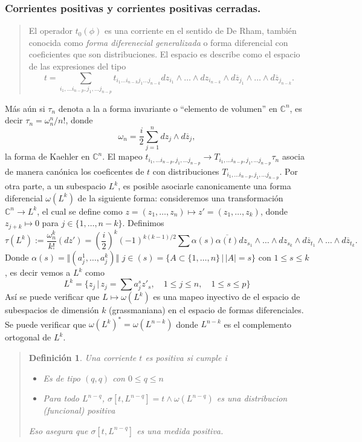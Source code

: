 \documentclass[letterpaper]{article}
\newtheorem{def.}{Definici\'on}[section]
\newcommand{\con}{\ensuremath{\mathbb{C}^n}}
\begin{document}
\subsubsection{Corrientes positivas y corrientes positivas cerradas.}
\label{sec:orgb974b8f}
\begin{quote}
El operador \(t_0(\phi)\) es una corriente en el sentido de De Rham, también conocida como \emph{forma diferenecial generalizada} o forma diferencial con coeficientes que son distribuciones. El espacio es describe como el espacio de las expresiones del tipo
\[
    t=\sum_{i_1,\dots i_{n-p},j_1,\dots j_{n-p}}t_{i_1\dots i_{n-k}j_1\dots j_{n-k}} dz_{i_1}\wedge\dots\wedge dz_{i_{n-k}}\wedge d\overline{z}_{j_1}\wedge\dots\wedge d\overline{z}_{j_{n-k}}.
\]
\end{quote}
Más aún si \(\tau_n\) denota a la a forma invariante o ``elemento de volumen'' en \(\con\), es decir \(\tau_n=\omega_n^n/n!\), donde
\[
    \omega_n=\frac{i}{2}\sum_{j=1}^n dz_j\wedge d\overline{z}_j,
\]
la forma de Kaehler en \(\con\). El mapeo \(t_{i_1,\dots i_{n-p},j_1,\dots j_{n-p}}\rightarrow T_{i_1,\dots i_{n-p},j_1,\dots j_{n-p}}\tau_n\) asocia de manera canónica los coeficentes de \(t\) con distribuciones \(T_{i_1,\dots i_{n-p},j_1,\dots j_{n-p}}\). Por otra parte, a un subespacio \(L^k\), es posible asociarle canonicamente una forma diferencial \(\omega(L^k)\) de la siguiente forma: consideremos una transformación \(\con\rightarrow L^k\), el cual se define como \(z=(z_1,\dots,z_n)\mapsto z'=(z_1,\dots,z_k)\), donde \(z_{j+k}\mapsto 0\) para \(j\in\{1,\dots,n-k\}\). Definimos
\[
    \tau(L^k):=\frac{\omega_n^k}{k!}(dz')=(\frac{i}{2})^k(-1)^{k(k-1)/2}\sum \alpha(s)\overline{\alpha(t)}dz_{s_1}\wedge\dots\wedge dz_{s_k}\wedge d\overline{z}_{t_1}\wedge \dots\wedge d\overline{z}_{t_k}.
\]
Donde \(\alpha(s)=\Vert(a^{1}_{j},\dots,a^{k}_{j})\Vert\) \(j\in(s)=\{A\subset\{1,\dots,n\}\,\vert\, |A|=s\}\) con \(1\leq s\leq k\), es decir vemos a \(L^k\) como
\[
    L^k=\{z_j\,\vert\,z_j=\sum a^{s}_{j}z'_s,\quad 1\leq j\leq n,\quad 1\leq s\leq p \}
\]
Así se puede verificar que \(L\mapsto\omega(L^k)\) es una mapeo inyectivo de el espacio de subespacios de dimensión \(k\) (grassmaniana) en el espacio de formas diferenciales. Se puede verificar que \(\omega(L^k)^{*}=\omega(L^{n-k})\) donde \(L^{n-k}\) es el complemento ortogonal de \(L^k\).
\begin{quote}
\begin{def.}
    Una corriente \(t\) es positiva si cumple
i    \begin{itemize}
        \item[a)] Es de tipo \((q,q)\) con \(0\leq q\leq n\)
        \item[b)] Para todo \(L^{n-q}\), \(\sigma[t,L^{n-q}]=t\wedge\omega(L^{n-q})\) es una distribucion (funcional) positiva
    \end{itemize}
    Eso asegura que \(\sigma[t,L^{n-q}]\) es una medida positiva.
\end{def.}
\end{quote}
\end{document}
